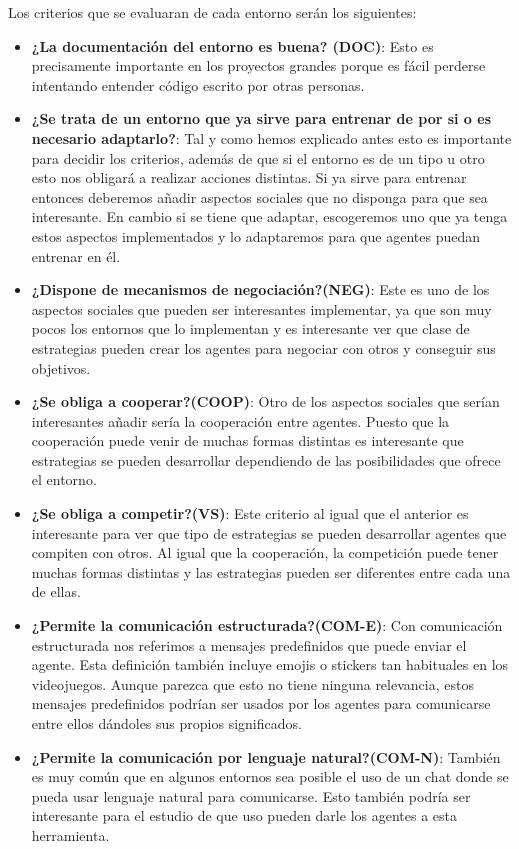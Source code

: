 Los criterios que se evaluaran de cada entorno serán los siguientes:
\begin{itemize}
    \item \textbf{¿La documentación del entorno es buena? (DOC)}: Esto es precisamente importante en los proyectos grandes porque es fácil perderse intentando entender código escrito por otras personas.
    \item \textbf{¿Se trata de un entorno que ya sirve para entrenar de por si o es necesario adaptarlo?}: Tal y como hemos explicado antes esto es importante para decidir los criterios, además de que si el entorno es de un tipo u otro esto nos obligará a realizar acciones distintas. Si ya sirve para entrenar entonces deberemos añadir aspectos sociales que no disponga para que sea interesante. En cambio si se tiene que adaptar, escogeremos uno que ya tenga estos aspectos implementados y lo adaptaremos para que agentes puedan entrenar en él.
    \item \textbf{¿Dispone de mecanismos de negociación?(NEG)}: Este es uno de los aspectos sociales que pueden ser interesantes implementar, ya que son muy pocos los entornos que lo implementan y es interesante ver que clase de estrategias pueden crear los agentes para negociar con otros y conseguir sus objetivos.
    \item \textbf{¿Se obliga a cooperar?(COOP)}: Otro de los aspectos sociales que serían interesantes añadir sería la cooperación entre agentes. Puesto que la cooperación puede venir de muchas formas distintas es interesante que estrategias se pueden desarrollar dependiendo de las posibilidades que ofrece el entorno.
    \item \textbf{¿Se obliga a competir?(VS)}: Este criterio al igual que el anterior es interesante para ver que tipo de estrategias se pueden desarrollar agentes que compiten con otros. Al igual que la cooperación, la competición puede tener muchas formas distintas y las estrategias pueden ser diferentes entre cada una de ellas.
    \item \textbf{¿Permite la comunicación estructurada?(COM-E)}: Con comunicación estructurada nos referimos a mensajes predefinidos que puede enviar el agente. Esta definición también incluye emojis o stickers tan habituales en los videojuegos. Aunque parezca que esto no tiene ninguna relevancia, estos mensajes predefinidos podrían ser usados por los agentes para comunicarse entre ellos dándoles sus propios significados.
    \item \textbf{¿Permite la comunicación por lenguaje natural?(COM-N)}: También es muy común que en algunos entornos sea posible el uso de un chat donde se pueda usar lenguaje natural para comunicarse. Esto también podría ser interesante para el estudio de que uso pueden darle los agentes a esta herramienta.

\end{itemize}
